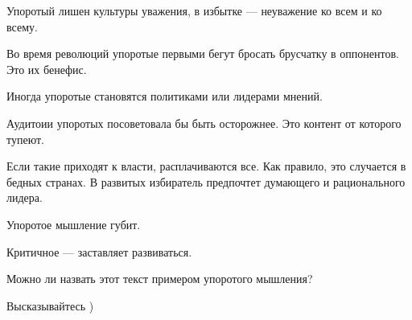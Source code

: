 Упоротый лишен культуры уважения, в избытке — неуважение ко всем и ко всему.

Во время революций упоротые первыми бегут бросать брусчатку в оппонентов. Это
их бенефис. 

Иногда упоротые становятся политиками или лидерами мнений. 

Аудитоии упоротых посоветовала бы быть осторожнее. Это контент от которого
тупеют. 

Если такие приходят к власти, расплачиваются все. Как правило,  это случается в
бедных странах. В развитых избиратель предпочтет думающего и рационального
лидера. 

Упоротое мышление губит. 

Критичное — заставляет развиваться. 

Можно ли назвать этот текст примером упоротого мышления? 

Высказывайтесь )
